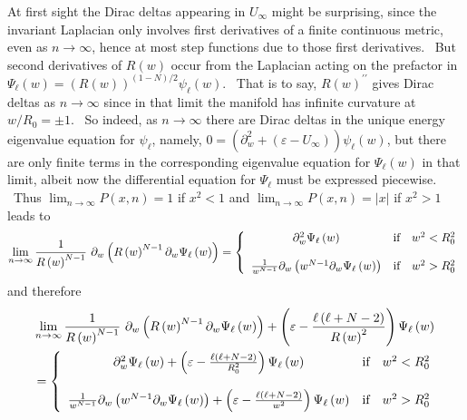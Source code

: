 \documentclass{article}%
\begin{document}
At first sight the Dirac deltas appearing in $U_{\infty}$ might be surprising,
since the invariant Laplacian only involves first derivatives of a finite
continuous metric, even as $n\rightarrow\infty$, hence at most step functions
due to those first derivatives. \ But second derivatives of $R\left(
w\right)  $ occur from the Laplacian acting on the prefactor in $\Psi_{\ell
}\left(  w\right)  =\left(  R\left(  w\right)  \right)  ^{\left(  1-N\right)
/2}\psi_{\ell}\left(  w\right)  $. \ That is to say, $R\left(  w\right)
^{\prime\prime}$ gives Dirac deltas as $n\rightarrow\infty$ since in that
limit the manifold has infinite curvature at $w/R_{0}=\pm1$. \ So indeed, as
$n\rightarrow\infty$ there are Dirac deltas in the unique energy eigenvalue
equation for $\psi_{\ell}$, namely, $0=\left(  \partial_{w}^{2}+\left(
\varepsilon-U_{\infty}\right)  \right)  \psi_{\ell}\left(  w\right)  $, but
there are only finite terms in the corresponding eigenvalue equation for
$\Psi_{\ell}\left(  w\right)  $ in that limit, albeit now the differential
equation for $\Psi_{\ell}$ must be expressed piecewise. \ Thus $\lim
_{n\rightarrow\infty}P\left(  x,n\right)  =1$ if $x^{2}<1$ and $\lim
_{n\rightarrow\infty}P\left(  x,n\right)  =\left\vert x\right\vert $ if
$x^{2}>1$ leads to%
\begin{equation}
\lim_{n\rightarrow\infty}\frac{1}{R\left(  w\right)  ^{N-1}}~\partial
_{w}\left(  R\left(  w\right)  ^{N-1}\partial_{w}\Psi_{\ell}\left(  w\right)
\right)  =\left\{
\begin{array}
[c]{ccc}%
\partial_{w}^{2}\Psi_{\ell}\left(  w\right)  & \text{if} & w^{2}<R_{0}^{2}\\
&  & \\
\frac{1}{w^{N-1}}\partial_{w}\left(  w^{N-1}\partial_{w}\Psi_{\ell}\left(
w\right)  \right)  & \text{if} & w^{2}>R_{0}^{2}%
\end{array}
\right.
\end{equation}
and therefore%
\begin{align}
&  \lim_{n\rightarrow\infty}\frac{1}{R\left(  w\right)  ^{N-1}}~\partial
_{w}\left(  R\left(  w\right)  ^{N-1}\partial_{w}\Psi_{\ell}\left(  w\right)
\right)  +\left(  \varepsilon-\frac{\ell\left(  \ell+N-2\right)  }{R\left(
w\right)  ^{2}}\right)  \Psi_{\ell}\left(  w\right) \nonumber\\
&  =\left\{
\begin{array}
[c]{ccc}%
\partial_{w}^{2}\Psi_{\ell}\left(  w\right)  +\left(  \varepsilon-\frac
{\ell\left(  \ell+N-2\right)  }{R_{0}^{2}}\right)  \Psi_{\ell}\left(  w\right)
& \text{if} & w^{2}<R_{0}^{2}\\
&  & \\
\frac{1}{w^{N-1}}\partial_{w}\left(  w^{N-1}\partial_{w}\Psi_{\ell}\left(
w\right)  \right)  +\left(  \varepsilon-\frac{\ell\left(  \ell+N-2\right)
}{w^{2}}\right)  \Psi_{\ell}\left(  w\right)  & \text{if} & w^{2}>R_{0}^{2}%
\end{array}
\right.
\end{align}
\end{document}
